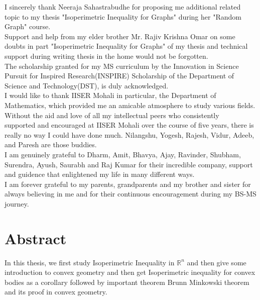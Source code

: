 \documentclass[oneside]{book}
\begin{document}
	I sincerely thank Neeraja Sahastrabudhe for proposing me additional related topic to my thesis "Isoperimetric Inequality for Graphs"  during her "Random Graph" course. \\
	
	Support and help from my elder brother Mr. Rajiv Krishna Omar on some doubts in part "Isoperimetric Inequality for Graphs" of my thesis and technical support during writing thesis in the home would not be forgotten.\\
	
	The scholarship granted for my MS curriculum by the Innovation in Science Pursuit for Inspired Research(INSPIRE) Scholarship of the Department of Science and Technology(DST), is duly acknowledged.\\
	
	
	I would like to thank IISER Mohali in particular, the Department of Mathematics, which provided me an amicable atmosphere to study various fields. \\
	
	Without the aid and love of all my intellectual peers who consistently \\supported and encouraged at IISER Mohali over the course of five years, there is really no way I could have done much. Nilangshu, Yogesh, Rajesh, Vidur, Adeeb, and Paresh are those buddies. 
	\\
	
	I am genuinely grateful to Dharm, Amit, Bhavya, Ajay, Ravinder, Shubham, Surendra, Ayush, Saurabh and Raj Kumar for their incredible company,
	support and guidence that enlightened my life in many different ways.\\
	
	I am forever grateful to my parents, grandparents and my brother and sister for always believing in me and for their continuous encouragement during my BS-MS journey.
	\thispagestyle{empty}
	
	\chapter*{Abstract}
	
	In this thesis, we first study Isoperimetric Inequality in $\mathbb{R}^{n}$ and then give some introduction to convex geometry and then get Isoperimetric inequality for convex bodies as a corollary followed by important theorem Brunn Minkowski theorem and its proof in convex geometry.
	
	
	
\end{document}
